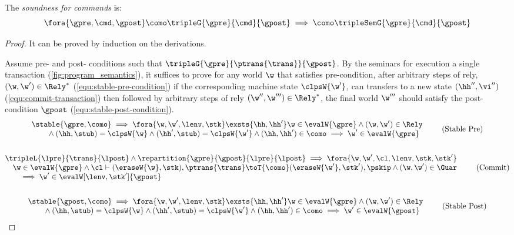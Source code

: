 \begin{theorem}
\label{thm:command-soundness}
\label{thm:per-thread-soundness}
The \emph{soundness for commands} is:
\[
    \fora{\gpre, \cmd, \gpost}
    \como \tripleG{\gpre}{\cmd}{\gpost} 
    \implies 
    \como \tripleSemG{\gpre}{\cmd}{\gpost} 
\]
\end{theorem}
\begin{proof}
It can be proved by induction on the derivations.


Assume pre- and post- conditions such that \( \tripleG{\gpre}{\ptrans{\trans}}{\gpost}  \).
By the seminars for execution a single transaction  (\cref{fig:program_semantics}), it suffices to prove for any world \( \w \) that satisfies pre-condition, after arbitrary steps of rely, \ie \( (\w, \w') \in \Rely^{*} \) (\cref{equ:stable-pre-condition}) if the corresponding machine state \(\clpsW{\w'}\), can transfers to a new state \((\hh'',\vi'')\) (\cref{equ:commit-transaction}) then followed by arbitrary steps of rely \((\w'',\w''') \in \Rely^{*} \), the final world \( \w''' \) should satisfy the post-condition \(\gpost\) (\cref{equ:stable-post-condition}).
\begin{gather}
    \begin{array}{@{}l}
    \stable{\gpre, \como}  
    \implies 
    \fora{\w, \w',\lenv, \stk}  
    \exsts{ \hh, \hh' } 
    \w \in \evalW{\gpre} 
    \land (\w, \w') \in \Rely \\
    \qquad {} \land (\hh, \stub) = \clpsW{\w}
    \land (\hh', \stub) = \clpsW{\w'}
    \land (\hh, \hh') \in \como
    \implies \w' \in \evalW{\gpre} 
    \end{array} \tag{Stable Pre} \label{equ:stable-pre-condition} \\
    \nonumber \\
%
    \begin{array}{@{}l}
    \tripleL{\lpre}{\trans}{\lpost}
    \land \repartition{\gpre}{\gpost}{\lpre}{\lpost}
    \implies 
    \fora{\w, \w', \cl, \lenv, \stk, \stk'} \\
    \quad \w \in \evalW{\gpre}
    \land \cl \vdash (\eraseW{\w}, \stk), \ptrans{\trans} 
    \toT{\como} (\eraseW{\w'}, \stk'), \pskip 
    \land (\w, \w') \in \Guar \\
    \qquad \implies \w' \in \evalW[\lenv, \stk']{\gpost} 
    \end{array} \tag{Commit} \label{equ:commit-transaction} \\
    \nonumber \\
%
    \begin{array}{@{}l}
    \stable{\gpost, \como}  
    \implies 
    \fora{\w, \w',\lenv, \stk}  
    \exsts{ \hh, \hh' } 
    \w \in \evalW{\gpre} 
    \land (\w, \w') \in \Rely \\
    \qquad {} \land (\hh, \stub) = \clpsW{\w}
    \land (\hh', \stub) = \clpsW{\w'}
    \land (\hh, \hh') \in \como
    \implies \w' \in \evalW{\gpost} 
    \end{array} \tag{Stable Post} \label{equ:stable-post-condition} 
\end{gather}



\end{proof}
